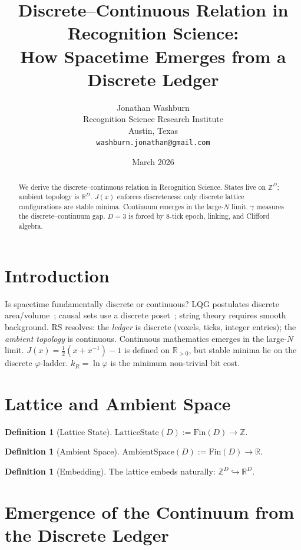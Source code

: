 \documentclass[12pt,a4paper]{article}
\title{Discrete--Continuous Relation in Recognition Science:\\
How Spacetime Emerges from a Discrete Ledger}
\author{Jonathan Washburn\\
Recognition Science Research Institute\\
Austin, Texas\\
\texttt{washburn.jonathan@gmail.com}}
\date{March 2026}
\theoremstyle{definition}
\newtheorem{definition}[theorem]{Definition}
\theoremstyle{remark}
\begin{document}
\maketitle

\begin{abstract}
We derive the discrete--continuous relation in Recognition Science.
States live on $\mathbb{Z}^D$; ambient topology is $\mathbb{R}^D$.
$J(x)$ enforces discreteness: only discrete lattice configurations
are stable minima.  Continuum emerges in the large-$N$ limit.
$\gamma$ measures the discrete--continuum gap.  $D = 3$ is forced by
8-tick epoch, linking, and Clifford algebra.
\end{abstract}

\section{Introduction}
\label{sec:intro}

Is spacetime fundamentally discrete or continuous?  LQG postulates
discrete area/volume~\cite{Rovelli}; causal sets use a discrete
poset~\cite{Sorkin}; string theory requires smooth background.  RS
resolves: the \emph{ledger} is discrete (voxels, ticks, integer
entries); the \emph{ambient topology} is continuous.  Continuous
mathematics emerges in the large-$N$ limit.  $J(x) =
\tfrac{1}{2}(x + x^{-1}) - 1$ is defined on $\mathbb{R}_{>0}$, but
stable minima lie on the discrete $\varphi$-ladder.  $k_R = \ln\varphi$
is the minimum non-trivial bit cost.

\section{Lattice and Ambient Space}
\label{sec:lattice}

\begin{definition}[Lattice State]
$\mathrm{LatticeState}(D) := \mathrm{Fin}(D) \to \mathbb{Z}$.
\end{definition}

\begin{definition}[Ambient Space]
$\mathrm{AmbientSpace}(D) := \mathrm{Fin}(D) \to \mathbb{R}$.
\end{definition}

\begin{definition}[Embedding]
The lattice embeds naturally: $\mathbb{Z}^D \hookrightarrow \mathbb{R}^D$.
\end{definition}

\section{Emergence of the Continuum from the Discrete Ledger}
\label{sec:emergence}
\end{document}
